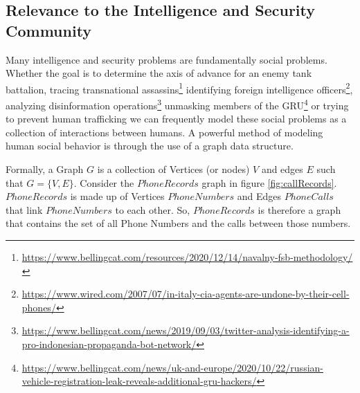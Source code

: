\documentclass[letterpaper, 10pt]{article}
\begin{document}
\begin{multicols}{2}
        \subsection{Relevance to the Intelligence and Security Community} \label{section:relevance}
        
        \par{Many intelligence and security problems are fundamentally social problems. 
        Whether the goal is to determine the axis of advance for an enemy tank battalion, tracing transnational assassins\footnote{\href{https://www.bellingcat.com/resources/2020/12/14/navalny-fsb-methodology/}{https://www.bellingcat.com/resources/2020/12/14/navalny-fsb-methodology/}} identifying foreign intelligence officers\footnote{\href{https://www.wired.com/2007/07/in-italy-cia-agents-are-undone-by-their-cell-phones/}{https://www.wired.com/2007/07/in-italy-cia-agents-are-undone-by-their-cell-phones/}}, analyzing disinformation operations\footnote{\href{https://www.bellingcat.com/news/2019/09/03/twitter-analysis-identifying-a-pro-indonesian-propaganda-bot-network/}{https://www.bellingcat.com/news/2019/09/03/twitter-analysis-identifying-a-pro-indonesian-propaganda-bot-network/}} unmasking members of the GRU\footnote{\href{https://www.bellingcat.com/news/uk-and-europe/2020/10/22/russian-vehicle-registration-leak-reveals-additional-gru-hackers/}{https://www.bellingcat.com/news/uk-and-europe/2020/10/22/russian-vehicle-registration-leak-reveals-additional-gru-hackers/}} or trying to prevent human trafficking \cite{Szekely2015} we can frequently model these social problems as a collection of interactions between humans. 
        A powerful method of modeling human social behavior is through the use of a graph data structure.
        
        Formally, a Graph $G$ is a collection of Vertices (or nodes) $V$ and edges $E$ such that $G=\{V,E\}$.
        Consider the $PhoneRecords$ graph in figure \ref{fig:callRecords}. $PhoneRecords$ is made up of Vertices $PhoneNumbers$ and Edges $PhoneCalls$ that link $PhoneNumbers$ to each other.
        So, $PhoneRecords$ is therefore a graph that contains the set of all Phone Numbers and the calls between those numbers.}


\end{multicols}
\end{document}
